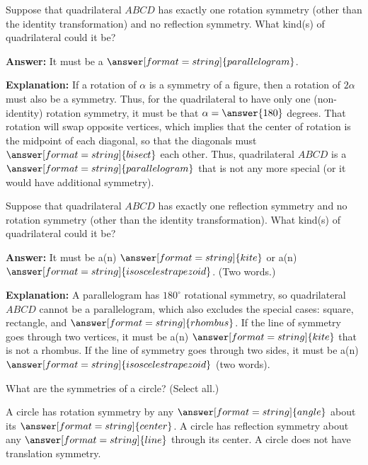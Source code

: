 \documentclass[nooutcomes]{ximera}
\begin{document}
\begin{question}
Suppose that quadrilateral $ABCD$ has exactly one rotation symmetry (other than the identity transformation) and no reflection symmetry.  What kind(s) of quadrilateral could it be?  

\textbf{Answer:}  It must be a $\answer[format=string]{parallelogram}$.
\begin{question}
\textbf{Explanation:} If a rotation of $\alpha$ is a symmetry of a figure, then a rotation of $2\alpha$ must also be a symmetry.  Thus, for the quadrilateral to have only one (non-identity) rotation symmetry, it must be that $\alpha = \answer{180}$ degrees.  That rotation will swap opposite vertices, which implies that the center of rotation is the midpoint of each diagonal, so that the diagonals must $\answer[format=string]{bisect}$ each other.  Thus, quadrilateral $ABCD$ is a $\answer[format=string]{parallelogram}$ that is not any more special (or it would have additional symmetry).  
\end{question}
\end{question}

\begin{question}
Suppose that quadrilateral $ABCD$ has exactly one reflection symmetry and no rotation symmetry (other than the identity transformation).  What kind(s) of quadrilateral could it be? 

\textbf{Answer:}  It must be a(n) $\answer[format=string]{kite}$ or 
a(n) $\answer[format=string]{isosceles trapezoid}$. (Two words.)
\begin{question}
\textbf{Explanation:}  A parallelogram has $180^\circ$ rotational symmetry, so quadrilateral $ABCD$ cannot be a parallelogram, which also excludes the special cases: square, rectangle, 
and $\answer[format=string]{rhombus}$.  If the line of symmetry goes through two vertices, it must be a(n) $\answer[format=string]{kite}$ that is not a rhombus.  If the line of symmetry goes through two sides, it must be a(n) $\answer[format=string]{isosceles trapezoid}$ (two words).  
\end{question}
\end{question}

\begin{question}
What are the symmetries of a circle? (Select all.)
\begin{selectAll}
\end{selectAll}
\begin{question}
A circle has rotation symmetry by any $\answer[format=string]{angle}$ 
about its $\answer[format=string]{center}$.  A circle has reflection symmetry 
about any $\answer[format=string]{line}$ through its center.  A circle does 
not have translation symmetry.  
\end{question}
\end{question}
\end{document}
